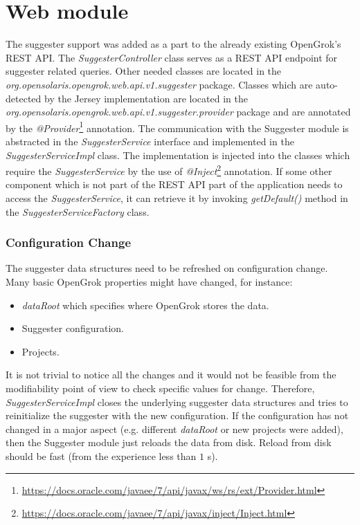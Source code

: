 \section{Web module}
The suggester support was added as a part to the already existing OpenGrok's REST API. The \textit{SuggesterController}
class serves as a REST API endpoint for suggester related queries. Other needed classes are located in the
\textit{org.opensolaris.\newline opengrok.web.api.v1.suggester} package. Classes which are auto-detected by the Jersey
implementation are located in the \textit{org.opensolaris.opengrok.web.api.v1.\newline suggester.provider} package and are annotated
by the \textit{@Provider}\footnote{\url{https://docs.oracle.com/javaee/7/api/javax/ws/rs/ext/Provider.html}} annotation.
The communication with the Suggester module is abstracted in the \textit{SuggesterService} interface and implemented in the
\textit{SuggesterServiceImpl} class. The implementation is injected into the classes which require the
\textit{SuggesterService} by the use of
\textit{@Inject}\footnote{\url{https://docs.oracle.com/javaee/7/api/javax/inject/Inject.html}} annotation. If some other
component which is not part of the REST API part of the application needs to access the \textit{SuggesterService},
it can retrieve it by invoking \textit{getDefault()} method in the \textit{SuggesterServiceFactory} class.

\subsubsection{Configuration Change}
The suggester data structures need to be refreshed on configuration change.
Many basic OpenGrok properties might have changed, for instance:
\begin{itemize}
    \item \textit{dataRoot} which specifies where OpenGrok stores the data.
    \item Suggester configuration.
    \item Projects.
\end{itemize}

It is not trivial to notice all the changes and it would not be feasible from the modifiability point of view to check
specific values for change. Therefore, \textit{SuggesterServiceImpl} closes the underlying suggester data structures
and tries to reinitialize the suggester with the new configuration. If the configuration has not changed in a major
aspect (e.g. different \textit{dataRoot} or new projects were added), then the Suggester module just reloads the data
from disk. Reload from disk should be fast (from the experience less than $1$ s).

